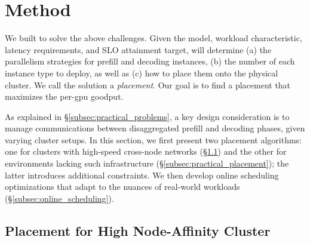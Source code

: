 \section{Method}
\label{sec:method}

We built \sys to solve the above challenges. Given the model, workload characteristic, latency requirements, and SLO attainment target, \sys will determine (a) the parallelism strategies for prefill and decoding instances, (b) the number of each instance type to deploy, as well as (c) how to place them onto the physical cluster. We call the solution a \textit{placement}. Our goal is to find a placement that maximizes the per-gpu goodput.

As explained in \S\ref{subsec:practical_problems}, a key design consideration is to manage communications between disaggregated prefill and decoding phases, given varying cluster setups.
In this section, we first present two placement algorithms: one for clusters with high-speed cross-node networks (\S\ref{subsec:optimal_placement}) and the other for environments lacking such infrastructure (\S\ref{subsec:practical_placement}); the latter introduces additional constraints. We then develop online scheduling optimizations that adapt to the nuances of real-world workloads (\S\ref{subsec:online_scheduling}).

\subsection{Placement for High Node-Affinity Cluster}
\label{subsec:optimal_placement}

